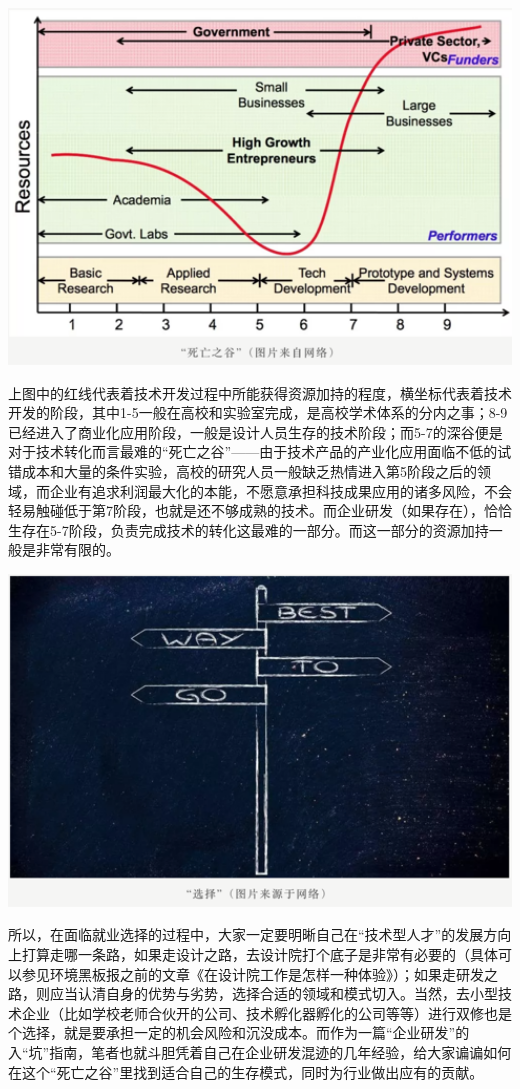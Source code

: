 \documentclass[
]{book}
\begin{document}
\includegraphics[width=6.67in]{images/qiye3}

上图中的红线代表着技术开发过程中所能获得资源加持的程度，横坐标代表着技术开发的阶段，其中1-5一般在高校和实验室完成，是高校学术体系的分内之事；8-9已经进入了商业化应用阶段，一般是设计人员生存的技术阶段；而5-7的深谷便是对于技术转化而言最难的``死亡之谷''------由于技术产品的产业化应用面临不低的试错成本和大量的条件实验，高校的研究人员一般缺乏热情进入第5阶段之后的领域，而企业有追求利润最大化的本能，不愿意承担科技成果应用的诸多风险，不会轻易触碰低于第7阶段，也就是还不够成熟的技术。而企业研发（如果存在），恰恰生存在5-7阶段，负责完成技术的转化这最难的一部分。而这一部分的资源加持一般是非常有限的。

\includegraphics[width=6.67in]{images/qiye4}

所以，在面临就业选择的过程中，大家一定要明晰自己在``技术型人才''的发展方向上打算走哪一条路，如果走设计之路，去设计院打个底子是非常有必要的（具体可以参见环境黑板报之前的文章《在设计院工作是怎样一种体验》）；如果走研发之路，则应当认清自身的优势与劣势，选择合适的领域和模式切入。当然，去小型技术企业（比如学校老师合伙开的公司、技术孵化器孵化的公司等等）进行双修也是个选择，就是要承担一定的机会风险和沉没成本。而作为一篇``企业研发''的入``坑''指南，笔者也就斗胆凭着自己在企业研发混迹的几年经验，给大家谝谝如何在这个``死亡之谷''里找到适合自己的生存模式，同时为行业做出应有的贡献。
\end{document}
